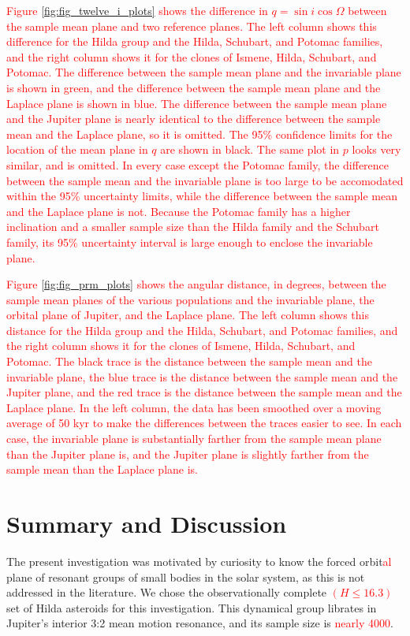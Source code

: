 \documentclass[a4paper,fleqn]{cas-sc}
\begin{document}
\begin{linenumbers}
\textcolor{red}{
Figure \ref{fig:fig_twelve_i_plots} shows the difference in $q=\sin{i}\cos{\Omega}$ between the sample mean plane and two reference planes.
The left column shows this difference for the Hilda group and the Hilda, Schubart, and Potomac families, and the right column shows it for the clones of Ismene, Hilda, Schubart, and Potomac.
The difference between the sample mean plane and the invariable plane is shown in green, and the difference between the sample mean plane and the Laplace plane is shown in blue.
The difference between the sample mean plane and the Jupiter plane is nearly identical to the difference between the sample mean and the Laplace plane, so it is omitted.
The 95\% confidence limits for the location of the mean plane in $q$ are shown in black.
The same plot in $p$ looks very similar, and is omitted.
In every case except the Potomac family, the difference between the sample mean and the invariable plane is too large to be accomodated within the 95\% uncertainty limits, while the difference between the sample mean and the Laplace plane is not.
Because the Potomac family has a higher inclination and a smaller sample size than the Hilda family and the Schubart family, its 95\% uncertainty interval is large enough to enclose the invariable plane.
}

\textcolor{red}{
Figure \ref{fig:fig_prm_plots} shows the angular distance, in degrees, between the sample mean planes of the various populations and the invariable plane, the orbital plane of Jupiter, and the Laplace plane.
The left column shows this distance for the Hilda group and the Hilda, Schubart, and Potomac families, and the right column shows it for the clones of Ismene, Hilda, Schubart, and Potomac.
The black trace is the distance between the sample mean and the invariable plane, the blue trace is the distance between the sample mean and the Jupiter plane, and the red trace is the distance between the sample mean and the Laplace plane.
In the left column, the data has been smoothed over a moving average of 50 kyr to make the differences between the traces easier to see.
In each case, the invariable plane is substantially farther from the sample mean plane than the Jupiter plane is, and the Jupiter plane is slightly farther from the sample mean than the Laplace plane is.
}

\section{Summary and Discussion}
\label{s:discussion}
The present investigation was motivated by curiosity to know the forced orbit\textcolor{red}{al} plane of resonant groups of small bodies in the solar system, as this is not addressed in the literature.
We chose the observationally complete \textcolor{red}{$(H\leq16.3)$} set of Hilda asteroids for this investigation.
This dynamical group librates in Jupiter's interior 3:2 mean motion resonance, and its sample size is \textcolor{red}{nearly 4000}.


\end{linenumbers}
\end{document}
